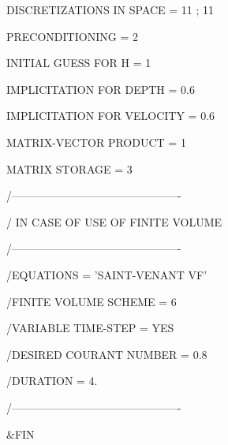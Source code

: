  DISCRETIZATIONS IN SPACE        = 11 ; 11

 PRECONDITIONING                 = 2

 INITIAL GUESS FOR H             = 1

 IMPLICITATION FOR DEPTH         = 0.6

 IMPLICITATION FOR VELOCITY      = 0.6

 MATRIX-VECTOR PRODUCT           = 1

 MATRIX STORAGE                  = 3



 /----------------------------------------------

 / IN CASE OF USE OF FINITE VOLUME

 /----------------------------------------------

 /EQUATIONS                         = 'SAINT-VENANT VF'

 /FINITE VOLUME SCHEME              = 6

 /VARIABLE TIME-STEP                = YES

 /DESIRED COURANT NUMBER            = 0.8

 /DURATION                          = 4.

 /----------------------------------------------



 \&FIN


